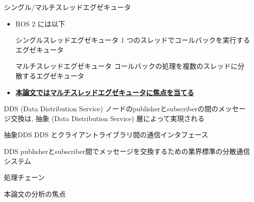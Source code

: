 \begin{frame}{シングル/マルチスレッドエグゼキュータ}
    \begin{itemize}
        \item ROS 2 には以下 
              \begin{block}{シングルスレッドエグゼキュータ}
                  1 つのスレッドでコールバックを実行するエグゼキュータ
              \end{block}
              \begin{block}{マルチスレッドエグゼキュータ}
                  コールバックの処理を複数のスレッドに分散するエグゼキュータ
              \end{block}
              \vspace{5mm}

        \item \textbf{\underline{本論文ではマルチスレッドエグゼキュータに焦点を当てる}}
    \end{itemize}
\end{frame}

\begin{frame}{DDS (Data Distribution Service)}
    ノードのpublisherとsubscriberの間のメッセージ交換は, 抽象 (Data Distribution Service) 層によって実現される

    \begin{block}{抽象DDS}
        DDS とクライアントライブラリ間の通信インタフェース
    \end{block}
    \begin{block}{DDS}
        publisherとsubscriber間でメッセージを交換するための業界標準の分散通信システム
    \end{block}
\end{frame}

\begin{frame}{処理チェーン}
\end{frame}

\begin{frame}{本論文の分析の焦点}

\end{frame}

